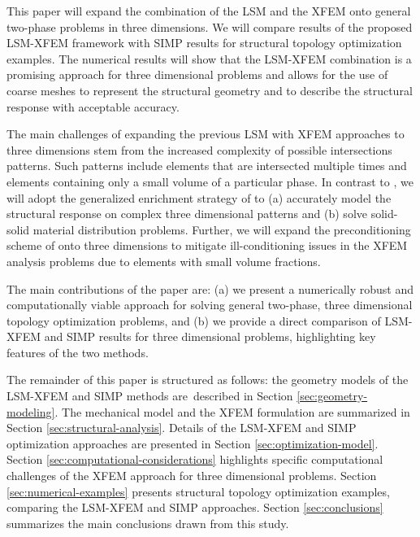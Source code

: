 This paper will expand the combination of the LSM and the XFEM onto general two-phase problems in three dimensions. We will compare results of the proposed LSM-XFEM framework with SIMP results for structural topology optimization examples. The numerical results will show that the LSM-XFEM combination is a promising approach for three dimensional problems and allows for the use of coarse meshes to represent the structural geometry and to describe the structural response with acceptable accuracy.

The main challenges of expanding the previous LSM with XFEM approaches to three dimensions stem from the increased complexity of possible intersections patterns. Such patterns include elements that are intersected multiple times and elements containing only a small volume of a particular phase. In contrast to \citet{LWW:12}, we will adopt the generalized enrichment strategy of \citet{MM:13} to (a) accurately model the structural response on complex three dimensional patterns and (b) solve solid-solid material distribution problems. Further, we will expand the preconditioning scheme of \citet{LMD+:13} onto three dimensions to mitigate ill-conditioning issues in the XFEM analysis problems due to elements with small volume fractions.

The main contributions of the paper are: (a) we present a numerically robust and computationally viable approach for solving general two-phase, three dimensional topology optimization problems, and (b) we provide a direct comparison of LSM-XFEM and SIMP results for three dimensional problems, highlighting key features of the two methods.

The remainder of this paper is structured as follows: the geometry models of the LSM-XFEM and SIMP methods are\ described in Section \ref{sec:geometry-modeling}. The mechanical model and the XFEM formulation are summarized  in Section \ref{sec:structural-analysis}. Details of the LSM-XFEM and SIMP optimization approaches are presented in Section \ref{sec:optimization-model}. Section \ref{sec:computational-considerations} highlights specific computational challenges of the XFEM approach for three dimensional problems. Section \ref{sec:numerical-examples} presents structural topology optimization examples, comparing the LSM-XFEM and SIMP approaches. Section \ref{sec:conclusions} summarizes the main conclusions drawn from this study.


